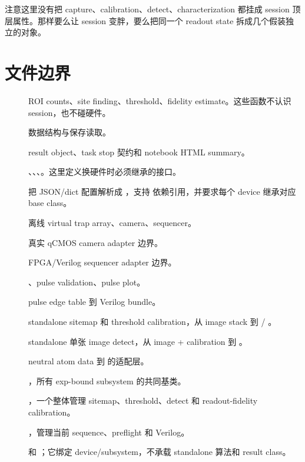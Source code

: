 \documentclass[11pt,oneside,openany]{book}
\begin{document}
注意这里没有把 capture、calibration、detect、characterization 都挂成 session 顶层属性。那样要么让 session 变胖，要么把同一个 readout state 拆成几个假装独立的对象。

\section{文件边界}
\begin{description}
  \item[] ROI counts、site finding、threshold、fidelity estimate。这些函数不认识 session，也不碰硬件。
  \item[]  数据结构与保存读取。
  \item[] result object、task stop 契约和 notebook HTML summary。
  \item[] 、、、。这里定义换硬件时必须继承的接口。
  \item[] 把 JSON/dict 配置解析成 ，支持  依赖引用，并要求每个 device 继承对应 base class。
  \item[] 离线 virtual trap array、camera、sequencer。
  \item[] 真实 qCMOS camera adapter 边界。
  \item[] FPGA/Verilog sequencer adapter 边界。
  \item[] 、pulse validation、pulse plot。
  \item[] pulse edge table 到 Verilog bundle。
  \item[] standalone sitemap 和 threshold calibration，从 image stack 到  / 。
  \item[] standalone 单张 image detect，从 image + calibration 到 。
  \item[] neutral atom data 到  的适配层。
  \item[] ，所有 exp-bound subsystem 的共同基类。
  \item[] ，一个整体管理 sitemap、threshold、detect 和 readout-fidelity calibration。
  \item[] ，管理当前 sequence、preflight 和 Verilog。
  \item[]  和 ；它绑定 device/subsystem，不承载 standalone 算法和 result class。
\end{description}
\end{document}
